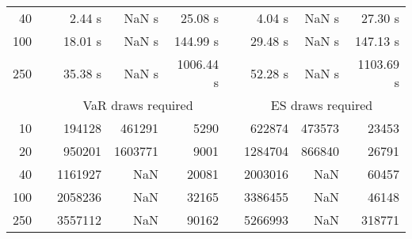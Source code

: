 {{\begin{longtable}{rr rrr r rrr}
40 & & 2.44 s &  NaN s & 25.08 s && 4.04 s &  NaN s & 27.30 s \\ 
100 & & 18.01 s &  NaN s & 144.99 s && 29.48 s &  NaN s & 147.13 s \\ 
250 & & 35.38 s &  NaN s & 1006.44 s && 52.28 s &  NaN s & 1103.69 s \\ 
\hline 
 && \multicolumn{3}{c}{VaR draws required} &&   \multicolumn{3}{c}{ES draws required} \\  \cline{3-5}  \cline{7-9} 
10 & & 194128 & 461291 & 5290 && 622874 & 473573 & 23453 \\ 
20 & & 950201 & 1603771 & 9001 && 1284704 & 866840 & 26791 \\ 
40 & & 1161927 & NaN & 20081 && 2003016 & NaN & 60457 \\ 
100 & & 2058236 & NaN & 32165 && 3386455 & NaN & 46148 \\ 
250 & & 3557112 & NaN & 90162 && 5266993 & NaN & 318771 \\ 
\hline 
\end{longtable} 
} 
} 
